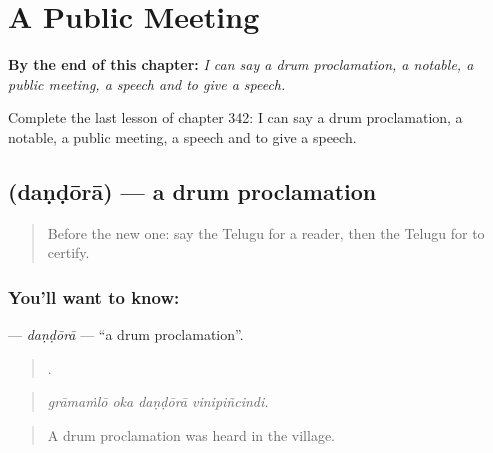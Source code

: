 
\chapter{A Public Meeting}
\label{ch:te-a-public-meeting}

\begin{chapteropening}
\textbf{By the end of this chapter:} \emph{I can say a drum proclamation, a notable, a public meeting, a speech and to give a speech.}

Complete the last lesson of chapter 342: I can say a drum proclamation, a notable, a public meeting, a speech and to give a speech.
\end{chapteropening}

\section[\texorpdfstring{\te{దండోరా} (daṇḍōrā)}{దండోరా (daṇḍōrā)}]{ (daṇḍōrā) — a drum proclamation}

\label{lesson:TE-C342-dandora}



\begin{quote}
Before the new one: say the Telugu for a reader, then the Telugu for to certify.
\end{quote}

\subsection*{You'll want to know: }
\textbf{} — \emph{daṇḍōrā} — \textquotedblleft{}a drum proclamation\textquotedblright{}.

\begin{quote}
   .
\end{quote}

\begin{quote}
\emph{grāmaṁlō oka daṇḍōrā vinipiñcindi.}
\end{quote}

\begin{quote}
A drum proclamation was heard in the village.
\end{quote}

